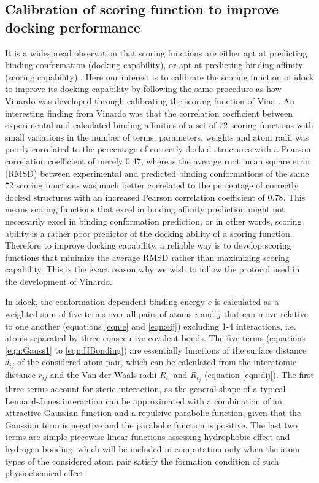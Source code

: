 \documentclass[a4paper,12pt]{article}
\begin{document}
\subsection*{Calibration of scoring function to improve docking performance}

It is a widespread observation that scoring functions are either apt at predicting binding conformation (docking capability), or apt at predicting binding affinity (scoring capability) \citep{1411,1695}. Here our interest is to calibrate the scoring function of idock \citep{1153} to improve its docking capability by following the same procedure as how Vinardo \citep{1741} was developed through calibrating the scoring function of Vina \citep{595}. An interesting finding from Vinardo was that the correlation coefficient between experimental and calculated binding affinities of a set of 72 scoring functions with small variations in the number of terms, parameters, weights and atom radii was poorly correlated to the percentage of correctly docked structures with a Pearson correlation coefficient of merely 0.47, whereas the average root mean square error (RMSD) between experimental and predicted binding conformations of the same 72 scoring functions was much better correlated to the percentage of correctly docked structures with an increased Pearson correlation coefficient of 0.78. This means scoring functions that excel in binding affinity prediction might not necessarily excel in binding conformation prediction, or in other words, scoring ability is a rather poor predictor of the docking ability of a scoring function. Therefore to improve docking capability, a reliable way is to develop scoring functions that minimize the average RMSD rather than maximizing scoring capability. This is the exact reason why we wish to follow the protocol used in the development of Vinardo.

In idock, the conformation-dependent binding energy $e$ is calculated as a weighted sum of five terms over all pairs of atoms $i$ and $j$ that can move relative to one another (equations \eqref{eqn:e} and \eqref{eqn:eij}) excluding 1-4 interactions, i.e. atoms separated by three consecutive covalent bonds. The five terms (equations \eqref{eqn:Gauss1} to \eqref{eqn:HBonding}) are essentially functions of the surface distance $d_{ij}$ of the considered atom pair, which can be calculated from the interatomic distance $r_{ij}$ and the Van der Waals radii $R_{t_i}$ and $R_{t_j}$ (equation \eqref{eqn:dij}). The first three terms account for steric interaction, as the general shape of a typical Lennard-Jones interaction can be approximated with a combination of an attractive Gaussian function and a repulsive parabolic function, given that the Gaussian term is negative and the parabolic function is positive. The last two terms are simple piecewise linear functions assessing hydrophobic effect and hydrogen bonding, which will be included in computation only when the atom types of the considered atom pair satisfy the formation condition of such physiochemical effect.
\end{document}
